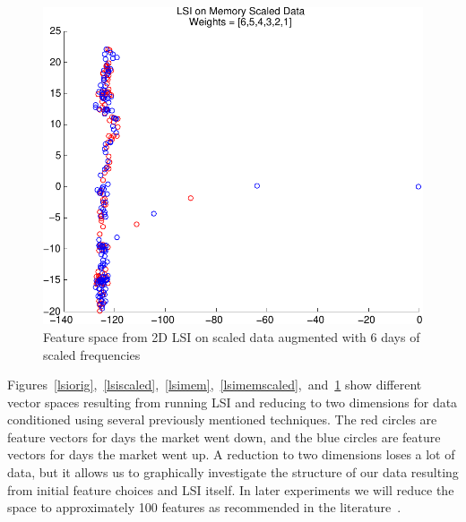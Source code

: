 \documentclass[10pt, twocolumn]{article}
\begin{document}
\begin{figure}
\centering
\includegraphics[scale=0.4]{plots/lsiscaledmem.pdf}
\caption{Feature space from 2D LSI on scaled data augmented with 6 days of scaled frequencies}
\label{lsiscaledmem}
\end{figure}

Figures~\ref{lsiorig},~\ref{lsiscaled},~\ref{lsimem},~\ref{lsimemscaled},~and~\ref{lsiscaledmem} show different vector spaces resulting from running LSI and reducing to two dimensions for data conditioned using several previously mentioned techniques. The red circles are feature vectors for days the market went down, and the blue circles are feature vectors for days the market went up. A reduction to two dimensions loses a lot of data, but it allows us to graphically investigate the structure of our data resulting from initial feature choices and LSI itself. In later experiments we will reduce the space to approximately 100 features as recommended in the literature~\cite{lsi}.  
\end{document}
